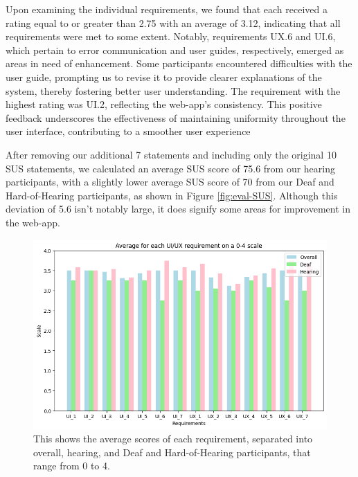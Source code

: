 \documentclass{l4proj}
\begin{document}
Upon examining the individual requirements, we found that each received a rating equal to or greater than 2.75 with an average of 3.12, indicating that all requirements were met to some extent. Notably, requirements UX.6 and UI.6, which pertain to error communication and user guides, respectively, emerged as areas in need of enhancement. Some participants encountered difficulties with the user guide, prompting us to revise it to provide clearer explanations of the system, thereby fostering better user understanding. The requirement with the highest rating was UI.2, reflecting the web-app's consistency. This positive feedback underscores the effectiveness of maintaining uniformity throughout the user interface, contributing to a smoother user experience

After removing our additional 7 statements and including only the original 10 SUS statements, we calculated an average SUS score of 75.6 from our hearing participants, with a slightly lower average SUS score of 70 from our Deaf and Hard-of-Hearing participants, as shown in Figure \ref{fig:eval-SUS}. Although this deviation of 5.6 isn't notably large, it does signify some areas for improvement in the web-app.

\begin{figure}
    \centering
    \includegraphics[width=0.75\linewidth]{dissertation/images/requirements.png}    
    \caption{This shows the average scores of each requirement, separated into overall, hearing, and Deaf and Hard-of-Hearing participants, that range from 0 to 4.}
    \label{fig:requirements}
\end{figure}

\end{document}
